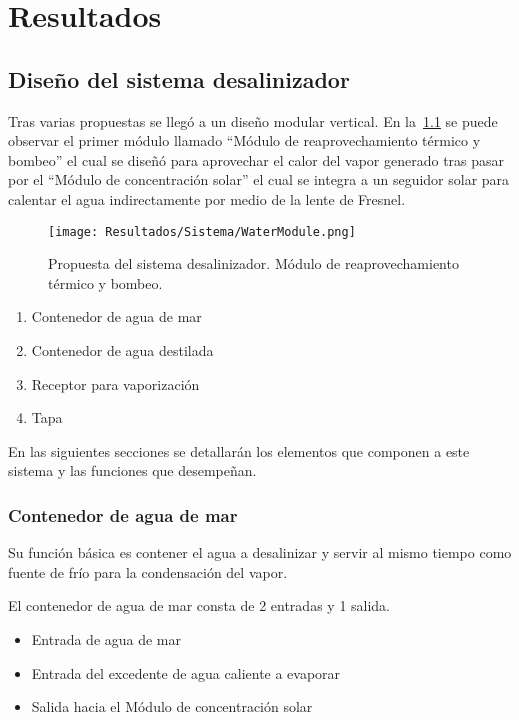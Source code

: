 \chapter{Resultados}
	
	\section{Diseño del sistema desalinizador}
		
		Tras varias propuestas se llegó a un diseño modular vertical. En la~\cref{fig:WaterModule} se puede observar el primer módulo llamado ``Módulo de reaprovechamiento térmico y bombeo'' el cual se diseñó para aprovechar el calor del vapor generado tras pasar por el ``Módulo de concentración solar'' el cual se integra a un seguidor solar para calentar el agua indirectamente por medio de la lente de Fresnel.
		
		
		\begin{figure}[H]
			\centering
			\texttt{[image: Resultados/Sistema/WaterModule.png]}
			\caption{Propuesta del sistema desalinizador. Módulo de reaprovechamiento térmico y bombeo.}
			\label{fig:WaterModule}
		\end{figure}
		
		\begin{enumerate}
			\item Contenedor de agua de mar
			\item Contenedor de agua destilada
			\item Receptor para vaporización
			\item Tapa
		\end{enumerate}
		
		En las siguientes secciones se detallarán los elementos que componen a este sistema y las funciones que desempeñan.
	
		\subsection{Contenedor de agua de mar}
			
			Su función básica es contener el agua a desalinizar y servir al mismo tiempo como fuente de frío para la condensación del vapor.
			
			El contenedor de agua de mar consta de 2 entradas y 1 salida.
			\begin{itemize}[columns=2]
				\item Entrada de agua de mar
				\item Entrada del excedente de agua caliente a evaporar
				\item Salida hacia el Módulo de concentración solar
			\end{itemize}
			
